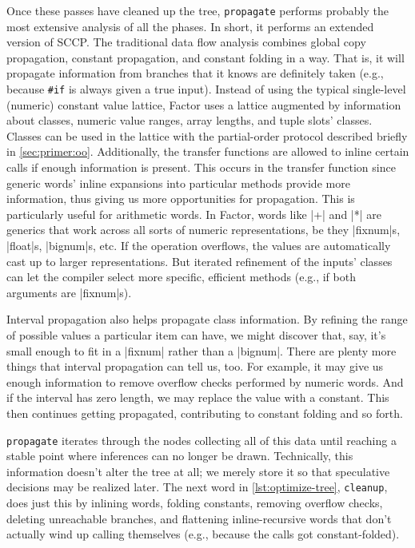 Once these passes have cleaned up the tree, \Verb|propagate| performs
probably the most extensive analysis of all the phases.  In short, it performs
an extended version of \gls{SCCP}.  The traditional data flow
analysis combines global copy propagation, constant propagation, and constant
folding in a  way.  That is, it will propagate information
from branches that it knows are definitely taken (e.g., because \Verb|#if| is
always given a true input).  Instead of using the typical single-level
(numeric) constant value lattice, Factor uses a lattice augmented by
information about classes, numeric value ranges, array lengths, and tuple
slots' classes.  Classes can be used in the lattice with the partial-order
protocol described briefly in \cref{sec:primer:oo}.  Additionally, the transfer
functions are allowed to inline certain calls if enough information is present.
This occurs in the transfer function since generic words' inline expansions
into particular methods provide more information, thus giving us more
opportunities for propagation.  This is particularly useful for arithmetic
words.  In Factor, words like \factor|+| and \factor|*| are generics that work
across all sorts of numeric representations, be they \factor|fixnum|s,
\factor|float|s, \factor|bignum|s, etc.  If the operation overflows, the values
are automatically cast up to larger representations.  But iterated refinement
of the inputs' classes can let the compiler select more specific, efficient
methods (e.g., if both arguments are \factor|fixnum|s).

Interval propagation also helps propagate class information.  By refining the
range of possible values a particular item can have, we might discover that,
say, it's small enough to fit in a \factor|fixnum| rather than a
\factor|bignum|.  There are plenty more things that interval propagation can
tell us, too.  For example, it may give us enough information to remove
overflow checks performed by numeric words.  And if the interval has zero
length, we may replace the value with a constant.  This then continues getting
propagated, contributing to constant folding and so forth.

\Verb|propagate| iterates through the nodes collecting all of this data until
reaching a stable point where inferences can no longer be drawn.  Technically,
this information doesn't alter the tree at all; we merely store it so that
speculative decisions may be realized later.  The next word in
\vref{lst:optimize-tree}, \Verb|cleanup|, does just this by inlining words,
folding constants, removing overflow checks, deleting unreachable branches, and
flattening inline-recursive words that don't actually wind up calling
themselves (e.g., because the calls got constant-folded).

